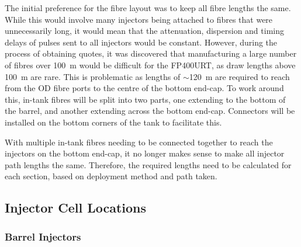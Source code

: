 \documentclass[a4paper,11pt]{article}
\let\oldsim\sim
\renewcommand{\sim}{{\oldsim}}
\begin{document}
The initial preference for the fibre layout was to keep all fibre lengths the same. While this would involve many injectors being attached to fibres that were unnecessarily long, it would mean that the attenuation, dispersion and timing delays of pulses sent to all injectors would be constant. However, during the process of obtaining quotes, it was discovered that manufacturing a large number of fibres over 100~m would be difficult for the FP400URT, as draw lengths above 100~m are rare. This is problematic as lengths of $\sim$120~m are required to reach from the OD fibre ports to the centre of the bottom end-cap. To work around this, in-tank fibres will be split into two parts, one extending to the bottom of the barrel, and another extending across the bottom end-cap. Connectors will be installed on the bottom corners of the tank to facilitate this.

With multiple in-tank fibres needing to be connected together to reach the injectors on the bottom end-cap, it no longer makes sense to make all injector path lengths the same. Therefore, the required lengths need to be calculated for each section, based on deployment method and path taken. 

\subsection{Injector Cell Locations}\label{sec:lengths:sub:inj}
\subsubsection{Barrel Injectors}\label{sec:lengths:sub:inj:sub:barrel}
\end{document}
